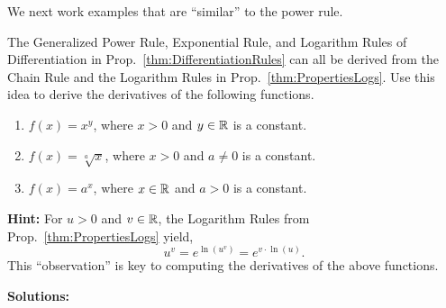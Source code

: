 \Qed

\vspace*{.2cm}

We next work examples that are ``similar'' to the power rule. \\

\begin{example} 
\label{ex:GeneralizedPowerExponentialLogarithmRules}
The Generalized Power Rule, Exponential Rule, and Logarithm Rules of Differentiation in Prop.~\ref{thm:DifferentiationRules} can all be derived from the Chain Rule and the Logarithm Rules in Prop.~\ref{thm:PropertiesLogs}. Use this idea to derive the derivatives of the following functions.

 \begin{enumerate}
   \renewcommand{\labelenumi}{(\alph{enumi})}
    \setlength{\itemsep}{.2cm}

    \item $f(x) = x^y$, where $x>0$ and $y\in \mathbb R$ is a constant.

    \item $f(x) = \sqrt[a]{x}$, where $x > 0$ and $a \neq 0$ is a constant.

    \item $f(x) =a^x$, where $x\in \mathbb R$ and $a>0$ is a constant.

    \end{enumerate}

    
    \textbf{Hint:} For $u>0$ and $v\in \mathbb R$, the Logarithm Rules from Prop.~\ref{thm:PropertiesLogs} yield,
    $$u^v = e^{\ln(u^v)} =   e^{v \cdot \ln(u)}.$$ 
    This ``observation'' is key to computing the derivatives of the above functions.
    
\end{example}

\textbf{Solutions:} 

